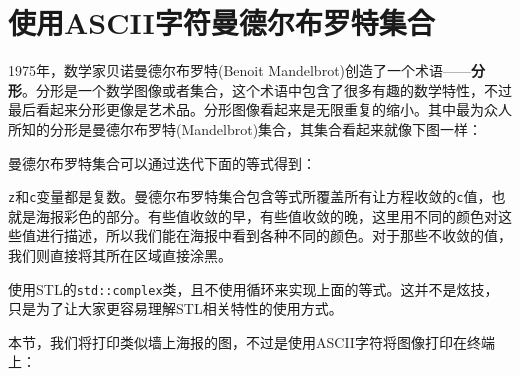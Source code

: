 \section{使用ASCII字符曼德尔布罗特集合}

1975年，数学家贝诺曼德尔布罗特(Benoit Mandelbrot)创造了一个术语——\textbf{分形}。分形是一个数学图像或者集合，这个术语中包含了很多有趣的数学特性，不过最后看起来分形更像是艺术品。分形图像看起来是无限重复的缩小。其中最为众人所知的分形是曼德尔布罗特(Mandelbrot)集合，其集合看起来就像下图一样：


曼德尔布罗特集合可以通过迭代下面的等式得到：


\texttt{z}和\texttt{c}变量都是复数。曼德尔布罗特集合包含等式所覆盖所有让方程收敛的\texttt{c}值，也就是海报彩色的部分。有些值收敛的早，有些值收敛的晚，这里用不同的颜色对这些值进行描述，所以我们能在海报中看到各种不同的颜色。对于那些不收敛的值，我们则直接将其所在区域直接涂黑。

使用STL的\texttt{std::complex}类，且不使用循环来实现上面的等式。这并不是炫技，只是为了让大家更容易理解STL相关特性的使用方式。


本节，我们将打印类似墙上海报的图，不过是使用ASCII字符将图像打印在终端上：

